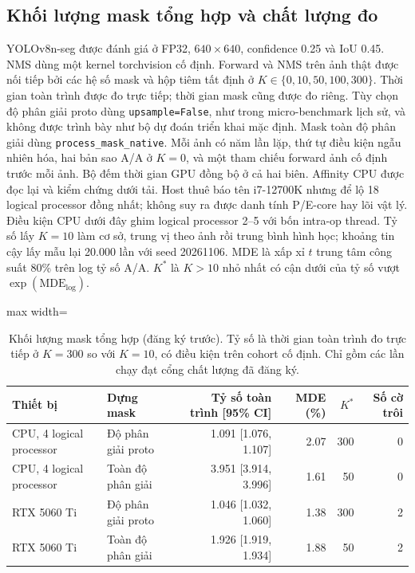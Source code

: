 \subsection{Khối lượng mask tổng hợp và chất lượng đo}
YOLOv8n-seg được đánh giá ở FP32, $640\times640$, confidence 0.25 và IoU 0.45. NMS dùng một kernel torchvision cố định. Forward và NMS trên ảnh thật được nối tiếp bởi các hệ số mask và hộp tiêm tất định ở $K\in\{0,10,50,100,300\}$. Thời gian toàn trình được đo trực tiếp; thời gian mask cũng được đo riêng. Tùy chọn độ phân giải proto dùng \texttt{upsample=False}, như trong micro-benchmark lịch sử, và không được trình bày như bộ dự đoán triển khai mặc định. Mask toàn độ phân giải dùng \texttt{process\_mask\_native}. Mỗi ảnh có năm lần lặp, thứ tự điều kiện ngẫu nhiên hóa, hai bản sao A/A ở $K=0$, và một tham chiếu forward ảnh cố định trước mỗi ảnh. Bộ đếm thời gian GPU đồng bộ ở cả hai biên. Affinity CPU được đọc lại và kiểm chứng dưới tải. Host thuê báo tên i7-12700K nhưng để lộ 18 logical processor đồng nhất; không suy ra được danh tính P/E-core hay lõi vật lý. Điều kiện CPU dưới đây ghim logical processor 2--5 với bốn intra-op thread. Tỷ số lấy $K=10$ làm cơ sở, trung vị theo ảnh rồi trung bình hình học; khoảng tin cậy lấy mẫu lại 20.000 lần với seed 20261106. MDE là xấp xỉ $t$ trung tâm công suất 80\% trên log tỷ số A/A. $K^*$ là $K>10$ nhỏ nhất có cận dưới của tỷ số vượt $\exp(\mathrm{MDE}_{\log})$.
\begin{table}[t]\centering
\caption{Khối lượng mask tổng hợp (đăng ký trước). Tỷ số là thời gian toàn trình đo trực tiếp ở $K=300$ so với $K=10$, có điều kiện trên cohort cố định. Chỉ gồm các lần chạy đạt cổng chất lượng đã đăng ký.}
\label{tab:seg-device}
\begin{adjustbox}{max width=\textwidth}\begin{tabular}{llrrrr}\toprule
Thiết bị & Dựng mask & Tỷ số toàn trình [95\% CI] & MDE (\%) & $K^*$ & Số cờ trôi\\\midrule
CPU, 4 logical processor & Độ phân giải proto & 1.091 [1.076, 1.107] & 2.07 & 300 & 0 \\
CPU, 4 logical processor & Toàn độ phân giải & 3.951 [3.914, 3.996] & 1.61 & 50 & 0 \\
RTX 5060 Ti & Độ phân giải proto & 1.046 [1.032, 1.060] & 1.38 & 300 & 2 \\
RTX 5060 Ti & Toàn độ phân giải & 1.926 [1.919, 1.934] & 1.88 & 50 & 2 \\
\bottomrule\end{tabular}\end{adjustbox}\end{table}
